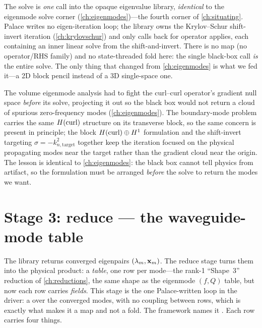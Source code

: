 \begin{keyidea}
The solve is \emph{one}  call into the opaque eigenvalue library,
\emph{identical} to the eigenmode solve corner (\cref{ch:eigenmodes})---the fourth
corner of \cref{ch:situating}. Palace writes no eigen-iteration loop; the library
owns the Krylov--Schur shift-invert iteration (\cref{ch:krylovschur}) and only
calls back for operator applies, each containing an inner linear solve from the
shift-and-invert. There is no  map (no operator/RHS family) and
no state-threaded fold here: the single black-box call \emph{is} the entire solve.
The only thing that changed from \cref{ch:eigenmodes} is what we fed it---a 2D
block pencil instead of a 3D single-space one.
\end{keyidea}

\begin{remark}
The volume eigenmode analysis had to fight the curl--curl operator's gradient null
space \emph{before} its solve, projecting it out so the black box would not return
a cloud of spurious zero-frequency modes (\cref{ch:eigenmodes}). The boundary-mode
problem carries the same $H(\mathrm{curl})$ structure on its transverse block, so the same
concern is present in principle; the block $H(\mathrm{curl})\oplus H^1$ formulation and the
shift-invert targeting $\sigma=-k_{n,\text{target}}^2$ together keep the iteration
focused on the physical propagating modes near the target rather than the
gradient cloud near the origin. The lesson is identical to
\cref{ch:eigenmodes}: the black box cannot tell physics from artifact, so the
formulation must be arranged \emph{before} the solve to return the modes we want.
\end{remark}

\section{Stage 3: reduce --- the waveguide-mode table}
\label{sec:reduce}

The library returns converged eigenpairs $(\lambda_m,\mathbf{x}_m)$. The reduce stage
turns them into the physical product: a \emph{table}, one row per mode---the rank-1
``Shape~3'' reduction of \cref{ch:reductions}, the same shape as the eigenmode
$(f,Q)$ table, but now each row carries \emph{fields}. This stage is the one
Palace-written loop in the driver: a  over the converged modes, with no
coupling between rows, which is exactly what makes it a map and not a fold. The
framework names it . Each row carries four things.

